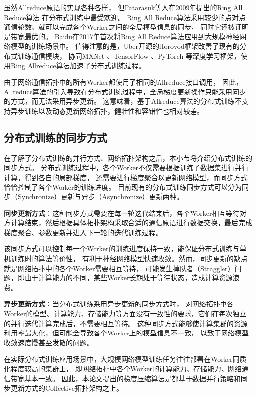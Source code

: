 \documentclass{xdupgthesis}
\begin{document}
虽然Allreduce原语的实现各种各样，
但Patarasuk等人在2009年提出的Ring All Reduce算法 \cite{patarasuk2009bandwidth} 在分布式训练中最受欢迎。
Ring All Reduce算法采用较少的点对点通信轮数，就可以完成各个Worker之间的全局模型信息的同步，
同时它还被证明是带宽最优的。
Baidu在2017年首次将Ring All Reduce算法应用到大规模神经网络模型的训练场景中。
值得注意的是，Uber开源的Horovod框架\cite{sergeev2018horovod}改善了现有的分布式训练通信模块，
协同MXNet \cite{chen2015mxnet}、TensorFlow \cite{abadi2016tensorflow}、PyTorch \cite{paszke2019pytorch}等深度学习框架，使用Ring Allreduce算法加速了分布式训练过程。

由于网络通信拓扑中的所有Worker都使用了相同的Allreduce接口调用，
因此，Allreduce算法的引入导致在分布式训练过程中，全局梯度更新操作只能采用同步的方式，而无法采用异步更新。
这意味着，基于Allreduce算法的分布式训练不支持异步训练以及动态更新网络拓扑，健壮性和容错性也相对较差。

\subsection{分布式训练的同步方式}
在了解了分布式训练的并行方式、网络拓扑架构之后，本小节将介绍分布式训练的同步方式。
分布式训练过程中，各个Worker不仅需要根据训练子数据集进行并行计算，得到各自的局部梯度，
还需要进行梯度聚合以更新网络模型，而同步方式恰恰控制了各个Worker的训练进度。
目前现有的分布式训练同步方式可以分为同步（Synchronize）更新与异步（Asynchronize）更新两种。

\textbf{同步更新方式}：这种同步方式需要在每一轮迭代结束后，各个Worker相互等待对方计算结束，然后根据具体拓扑架构采取合适的通信原语进行数据交换，最后完成梯度聚合、参数更新并进入下一轮的迭代训练过程。

该同步方式可以控制每一个Worker的训练进度保持一致，能保证分布式训练与单机训练时的算法等价性，
有利于神经网络模型快速收敛。然而，同步更新的缺点就是网络拓扑中的各个Worker需要相互等待，
可能发生掉队者（Straggler）问题，即由于计算能力的不同，某些Worker长期处于等待状态，造成计算资源浪费。

\textbf{异步更新方式}：当分布式训练采用异步更新的同步方式时，
对网络拓扑中各Worker的模型、计算能力、存储能力等方面没有一致性的要求，它们在每次独立的并行迭代计算完成后，不需要相互等待。
这种同步方式能够使计算集群的资源利用率最大化，但可能会导致各个Worker上的模型信息不一致，
以致于网络模型收敛速度慢甚至发散的问题。

在实际分布式训练应用场景中，大规模网络模型训练任务往往部署在Worker同质化程度较高的集群上，
即网络拓扑中各个Worker的计算能力、存储能力、网络通信带宽基本一致。
因此，本论文提出的梯度压缩算法是都基于数据并行策略和同步更新方式的Collective拓扑架构之上。
\end{document}
